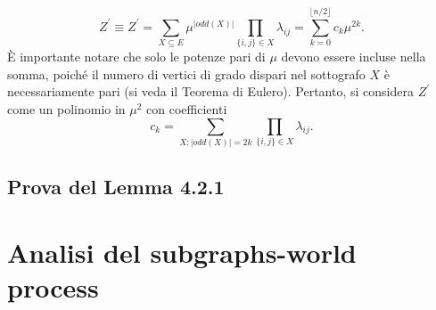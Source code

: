 \begin{equation}
	Z^{\prime} \equiv Z^{\prime} = \sum_{X \subseteq E}{\mu^{|odd(X)|}} \prod_{\{i,j\}\in X}{\lambda_{ij} = \sum_{k=0}^{\lfloor n/2 \rfloor}}{c_k\mu^{2k}}.
\end{equation}
È importante notare che solo le potenze pari di $\mu$ devono essere incluse nella somma, poiché il numero di vertici di grado dispari nel sottografo $X$ è necessariamente pari (si veda il Teorema di Eulero). Pertanto, si considera $Z^{\prime}$ come un polinomio in $\mu^2$ con coefficienti
\begin{equation}
	c_k = \sum_{X:|odd(X)|=2k}{\prod_{\{i,j\}\in X}}{\lambda_{ij}}.
\end{equation}
\subsection{Prova del Lemma 4.2.1}\label{ssec:lemmaproof}
\section{Analisi del subgraphs-world process} \label{sec:swp}